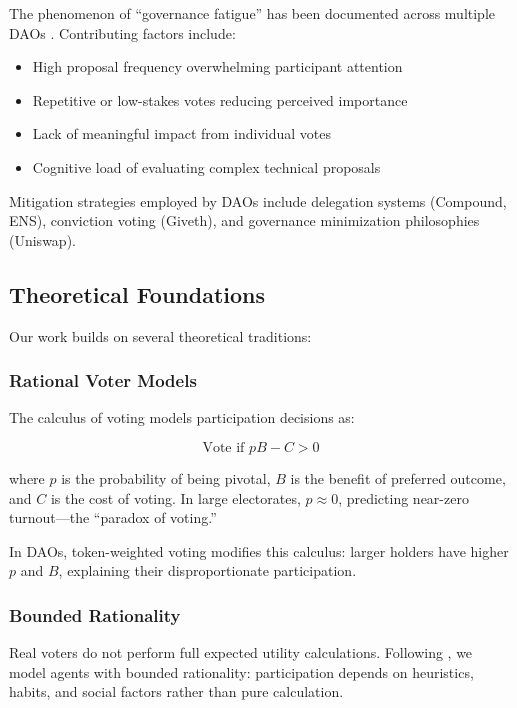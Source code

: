 The phenomenon of ``governance fatigue'' has been documented across multiple DAOs \citep{snapshot2021governance}. Contributing factors include:

\begin{itemize}
    \item High proposal frequency overwhelming participant attention
    \item Repetitive or low-stakes votes reducing perceived importance
    \item Lack of meaningful impact from individual votes
    \item Cognitive load of evaluating complex technical proposals
\end{itemize}

Mitigation strategies employed by DAOs include delegation systems (Compound, ENS), conviction voting (Giveth), and governance minimization philosophies (Uniswap).

\subsection{Theoretical Foundations}

Our work builds on several theoretical traditions:

\subsubsection{Rational Voter Models}

The calculus of voting \citep{olson1965logic} models participation decisions as:

\begin{equation}
\text{Vote if } pB - C > 0
\end{equation}

where $p$ is the probability of being pivotal, $B$ is the benefit of preferred outcome, and $C$ is the cost of voting. In large electorates, $p \approx 0$, predicting near-zero turnout---the ``paradox of voting.''

In DAOs, token-weighted voting modifies this calculus: larger holders have higher $p$ and $B$, explaining their disproportionate participation.

\subsubsection{Bounded Rationality}

Real voters do not perform full expected utility calculations. Following \citet{ostrom1990governing}, we model agents with bounded rationality: participation depends on heuristics, habits, and social factors rather than pure calculation.

